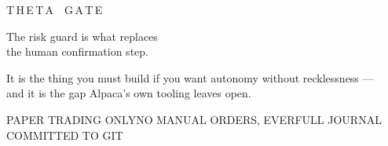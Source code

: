 \documentclass[aspectratio=169,10pt]{beamer}
\begin{document}
\begin{frame}[plain]
  \vspace{2.2cm}
  {\ttfamily\large\textcolor{ink}{T\,H\,E\,T\,A\ \ G\,A\,T\,E}}

  \vspace{0.72em}
  {\LARGE The risk guard is what replaces\\[0.15em] the human confirmation step.}

  \vspace{0.72em}
  \textcolor{muted}{It is the thing you must build if you want autonomy without recklessness ---\\
  and it is the gap Alpaca's own tooling leaves open.}

  \vfill
  {\ttfamily\scriptsize\textcolor{soft}{PAPER TRADING ONLY\quad\textbullet\quad NO MANUAL ORDERS, EVER\quad\textbullet\quad FULL JOURNAL COMMITTED TO GIT}}
  \vspace{0.8cm}
\end{frame}
\end{document}
